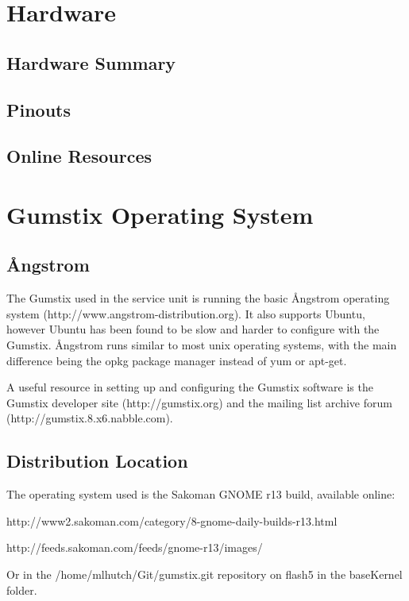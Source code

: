 \section{Hardware}

\subsection{Hardware Summary}

\subsection{Pinouts}

\subsection{Online Resources}

\section{Gumstix Operating System}

\subsection{\r{A}ngstrom}

The Gumstix used in the service unit is running the basic \r{A}ngstrom operating system (http://www.angstrom-distribution.org).
It also supports Ubuntu, however Ubuntu has been found to be slow and harder to configure with the Gumstix.
\r{A}ngstrom runs similar to most unix operating systems, with the main difference being the opkg package manager instead of yum or apt-get.

A useful resource in setting up and configuring the Gumstix software is the Gumstix developer site (http://gumstix.org) and the mailing list archive forum (http://gumstix.8.x6.nabble.com).

\subsection{Distribution Location}

The operating system used is the Sakoman GNOME r13 build, available online:

http://www2.sakoman.com/category/8-gnome-daily-builds-r13.html

http://feeds.sakoman.com/feeds/gnome-r13/images/

Or in the /home/mlhutch/Git/gumstix.git repository on flash5 in the baseKernel folder.

